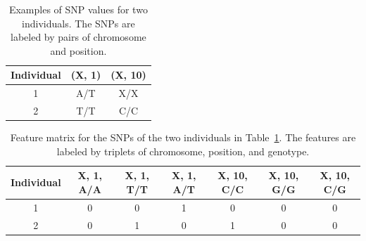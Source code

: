 \begin{table}[h!]
  \begin{center}
    \begin{tabular}{ c c c }
      \hline
      \textbf{Individual} & \textbf{(X, 1)} & \textbf{(X, 10)} \\ \hline
      1 & A/T & X/X \\
      2 & T/T & C/C \\
    \end{tabular}
  \end{center}
  \caption{Examples of SNP values for two individuals.  The SNPs are labeled by pairs of chromosome and position.}
  \label{tab:encoding-example-snps}
\end{table}

\begin{table}[h!]
  \begin{center}
    \begin{tabular}{ c c c c c c c }
      \hline
      \textbf{Individual} & \textbf{X, 1, A/A} & \textbf{X, 1, T/T} & \textbf{X, 1, A/T} & \textbf{X, 10, C/C} & \textbf{X, 10, G/G} &\textbf{X, 10, C/G} \\ \hline
      1 & 0 & 0 & 1 & 0 & 0 & 0 \\
      2 & 0 & 1 & 0 & 1 & 0 & 0 \\
    \end{tabular}
  \end{center}
  \caption{Feature matrix for the SNPs of the two individuals in Table~\ref{tab:encoding-example-snps}.  The features are labeled by triplets of chromosome, position, and genotype.}
  \label{tab:encoding-example-features}
\end{table}

